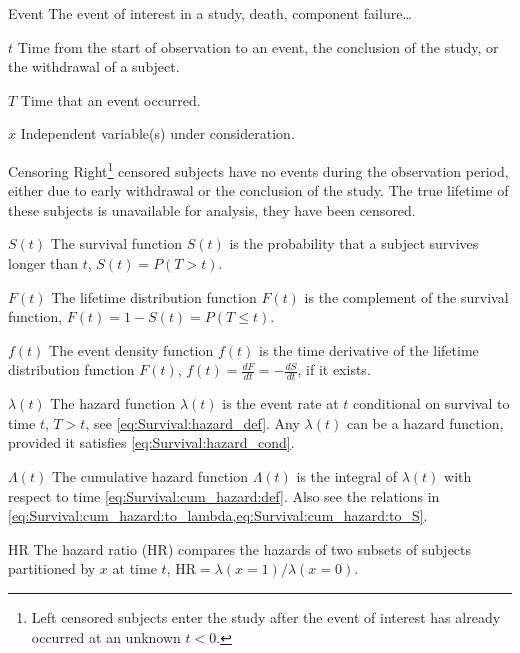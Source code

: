 \begin{symbollist}
	\item[Event] The event of interest in a study, \eg death, component failure\ldots
	\item[$t$] Time from the start of observation to an event, the conclusion of the study, or the withdrawal of a subject.
	\item[$T$] Time that an event occurred.
	\item[$x$] Independent variable(s) under consideration.
	\item[Censoring] Right\footnote{Left censored subjects enter the study after the event of interest has already occurred at an unknown $t < 0$.} censored subjects have no events during the observation period, either due to early withdrawal or the conclusion of the study. The true lifetime of these subjects is unavailable for analysis, \ie they have been censored.
	\item[$S\left(t\right)$] The survival function $S\left(t\right)$ is the probability that a subject survives longer than $t$, \ie $S\left(t\right) = P\left(T > t\right)$.
	\item[$F\left(t\right)$] The lifetime distribution function $F\left(t\right)$ is the complement of the survival function, \ie $F\left(t\right) = 1 - S\left(t\right) = P\left(T \leq t\right)$.
	\item[$f\left(t\right)$] The event density function $f\left(t\right)$ is the time derivative of the lifetime distribution function $F\left(t\right)$, $f\left(t\right) = \frac{dF}{dt} = -\frac{dS}{dt}$, if it exists.
	\item[$\lambda\left(t\right)$] The hazard function $\lambda\left(t\right)$ is the event rate at $t$ conditional on survival to time $t$, \ie $T > t$, see \cref{eq:Survival:hazard_def}. Any $\lambda\left(t\right)$ can be a hazard function, provided it satisfies \cref{eq:Survival:hazard_cond}.
	\item[$\Lambda\left(t\right)$] The cumulative hazard function $\Lambda\left(t\right)$ is the integral of $\lambda\left(t\right)$ with respect to time \cref{eq:Survival:cum_hazard:def}. Also see the relations in \cref{eq:Survival:cum_hazard:to_lambda,eq:Survival:cum_hazard:to_S}.
	\item[HR] The hazard ratio (HR) compares the hazards of two subsets of subjects partitioned by $x$ at time $t$, $\text{HR} = \lambda\left(x = 1\right) / \lambda\left(x=0\right)$.
\end{symbollist}

